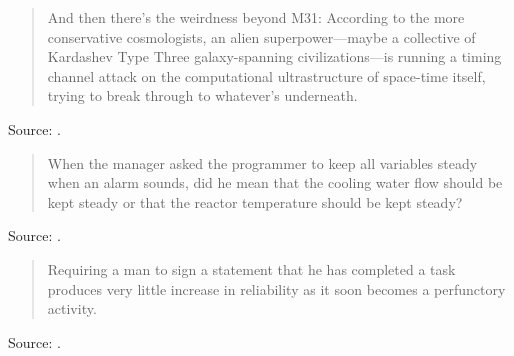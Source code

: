 \documentclass[a4paper]{article}
\begin{document}
\begin{quote}
	And then there's the weirdness beyond M31: According to the more conservative cosmologists, an
alien superpower---maybe a collective of Kardashev Type Three galaxy-spanning civilizations---is
running a timing channel attack on the computational ultrastructure of space-time itself, trying
to break through to whatever's underneath. 
\end{quote}
Source: \citet{Stross2005b}.
\medskip

\begin{quote}
	When the manager asked the programmer to keep all variables steady when an alarm sounds, did he
mean that the cooling water flow should be kept steady or that the reactor temperature should be
kept steady?
\end{quote}
Source: \citet[p.~155]{Kletz1991}.
\medskip

\begin{quote}
	Requiring a man to sign a statement that he has completed a task produces very little increase
in reliability as it soon becomes a perfunctory activity.
\end{quote}
Source: \citet[p.~108]{Kletz1991}.
\medskip
\end{document}
